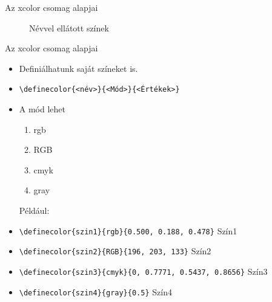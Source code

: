 \documentclass[aspectratio=1610]{beamer}
\begin{document}
\begin{frame}[fragile]{Az xcolor csomag alapjai}
\begin{minipage}{0.35\textwidth}
\begin{figure}
                \caption{Névvel ellátott színek}
            \end{figure}
        \end{minipage}
    \end{frame}

    \begin{frame}[fragile]{Az xcolor csomag alapjai}
        \begin{minipage}{0.8\textwidth}
            \begin{itemize}
                \item {}Definiálhatunk saját színeket is.
                \item {}\verb!\definecolor{<név>}{<Mód>}{<Értékek>}!
                \item {}A mód lehet
                \begin{enumerate}
                    \item {}rgb
                    \item {}RGB
                    \item {}cmyk
                    \item {}gray    
                \end{enumerate}
                Például:
                \item {}\verb!\definecolor{szin1}{rgb}{0.500, 0.188, 0.478}! \hfill \textcolor{szin1}{Szín1}
                \item {}\verb!\definecolor{szin2}{RGB}{196, 203, 133}! \hfill \textcolor{szin2}{Szín2}
                \item {}\verb!\definecolor{szin3}{cmyk}{0, 0.7771, 0.5437, 0.8656}! \hfill \textcolor{szin3}{Szín3}
                \item {}\verb!\definecolor{szin4}{gray}{0.5}! \hfill \textcolor{szin4}{Szín4}
            \end{itemize}
            
        \end{minipage} 
        
    \end{frame}
\end{document}
